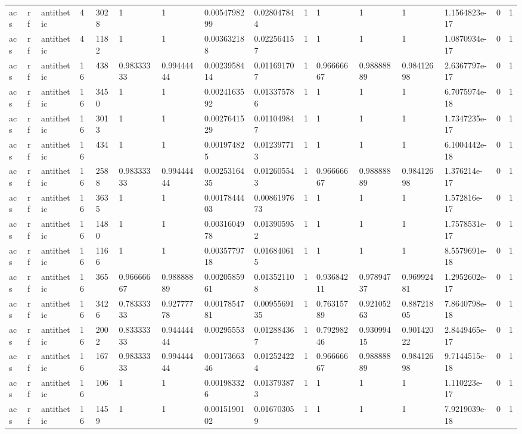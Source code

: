 \begin{tabular}{llllllllllllllll}
acs & rf & antithetic & 4 & 3028 & 1 & 1 & 0.0054798299 & 0.028047844 & 1 & 1 & 1 & 1 & 1.1564823e-17 & 0 & 1 \\
acs & rf & antithetic & 4 & 1182 & 1 & 1 & 0.003632188 & 0.022564157 & 1 & 1 & 1 & 1 & 1.0870934e-17 & 0 & 1 \\
acs & rf & antithetic & 16 & 438 & 0.98333333 & 0.99444444 & 0.0023958414 & 0.011691707 & 1 & 0.96666667 & 0.98888889 & 0.98412698 & 2.6367797e-17 & 0 & 1 \\
acs & rf & antithetic & 16 & 3450 & 1 & 1 & 0.0024163592 & 0.013375786 & 1 & 1 & 1 & 1 & 6.7075974e-18 & 0 & 1 \\
acs & rf & antithetic & 16 & 3013 & 1 & 1 & 0.0027641529 & 0.011049847 & 1 & 1 & 1 & 1 & 1.7347235e-17 & 0 & 1 \\
acs & rf & antithetic & 16 & 434 & 1 & 1 & 0.001974825 & 0.012397713 & 1 & 1 & 1 & 1 & 6.1004442e-18 & 0 & 1 \\
acs & rf & antithetic & 16 & 2588 & 0.98333333 & 0.99444444 & 0.0025316435 & 0.012605543 & 1 & 0.96666667 & 0.98888889 & 0.98412698 & 1.376214e-17 & 0 & 1 \\
acs & rf & antithetic & 16 & 3635 & 1 & 1 & 0.0017844403 & 0.0086197673 & 1 & 1 & 1 & 1 & 1.572816e-17 & 0 & 1 \\
acs & rf & antithetic & 16 & 1480 & 1 & 1 & 0.0031604978 & 0.013905952 & 1 & 1 & 1 & 1 & 1.7578531e-17 & 0 & 1 \\
acs & rf & antithetic & 16 & 1166 & 1 & 1 & 0.0035779718 & 0.016840615 & 1 & 1 & 1 & 1 & 8.5579691e-18 & 0 & 1 \\
acs & rf & antithetic & 16 & 365 & 0.96666667 & 0.98888889 & 0.0020585961 & 0.013521108 & 1 & 0.93684211 & 0.97894737 & 0.96992481 & 1.2952602e-17 & 0 & 1 \\
acs & rf & antithetic & 16 & 3426 & 0.78333333 & 0.92777778 & 0.0017854781 & 0.0095569135 & 1 & 0.76315789 & 0.92105263 & 0.88721805 & 7.8640798e-18 & 0 & 1 \\
acs & rf & antithetic & 16 & 2002 & 0.83333333 & 0.94444444 & 0.00295553 & 0.012884367 & 1 & 0.79298246 & 0.93099415 & 0.90142022 & 2.8449465e-17 & 0 & 1 \\
acs & rf & antithetic & 16 & 167 & 0.98333333 & 0.99444444 & 0.0017366346 & 0.012524224 & 1 & 0.96666667 & 0.98888889 & 0.98412698 & 9.7144515e-18 & 0 & 1 \\
acs & rf & antithetic & 16 & 106 & 1 & 1 & 0.001983326 & 0.013793873 & 1 & 1 & 1 & 1 & 1.110223e-17 & 0 & 1 \\
acs & rf & antithetic & 16 & 1459 & 1 & 1 & 0.0015190102 & 0.016703059 & 1 & 1 & 1 & 1 & 7.9219039e-18 & 0 & 1 \\

\end{tabular}
